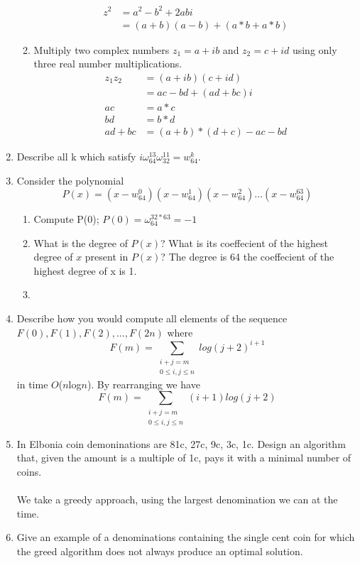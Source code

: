 \documentclass[a4paper]{article}
\begin{document}
\begin{enumerate}
\begin{enumerate}
								\begin{align*}
										z^2 &= a^2 - b^2 + 2abi \\
										&= (a+b)(a-b) +(a*b + a*b)
								\end{align*}
						\item Multiply two complex numbers $z_1 = a + ib$ and $z_2 = c + id$ using only three real number multiplications.
								\begin{align*}
										z_1 z_2 &= (a + ib)(c + id) \\
										&= ac - bd + (ad + bc)i \\
										ac &= a * c \\
										bd &= b * d \\
										ad + bc &= (a + b) * (d + c) - ac - bd
								\end{align*}
				\end{enumerate}
		\item Describe all k which satisfy $i\omega^{13}_{64}\omega^{11}_{32}=w^{k}_{64}$.
		\item Consider the polynomial $$P(x) = (x-w^{0}_{64})(x-w^{1}_{64})(x-w^{2}_{64}) ... (x-w^{63}_{64})$$
				\begin{enumerate}
						\item Compute P(0); 
								$P(0) = \omega_{64}^{32*63} = -1$
						\item What is the degree of $P(x)$? What is its coeffecient of the highest degree of $x$ present in $P(x)$?
								The degree is 64 the coeffecient of the highest degree of x is 1.
						\item 
				\end{enumerate}
		\item Describe how you would compute all elements of the sequence $F(0), F(1), F(2),..., F(2n)$ where $$F(m) = \sum_{\substack{i+j=m\\0\leq i,j\leq n}} log(j+2)^{i+1}$$ in time $O$($n$log$n$).
				By rearranging we have $$F(m) = \sum_{\substack{i+j=m\\0\leq i,j\leq n}} (i+1)log(j+2) $$
		\item In Elbonia coin demoninations are 81c, 27c, 9c, 3c, 1c. Design an algorithm that, given the amount is a multiple of 1c, pays it with a minimal number of coins. \\ \\
				We take a greedy approach, using the largest denomination we can at the time. 
		\item Give an example of a denominations containing the single cent coin for which the greed algorithm does not always produce an optimal solution. \\ \\

\end{enumerate}
\end{document}
